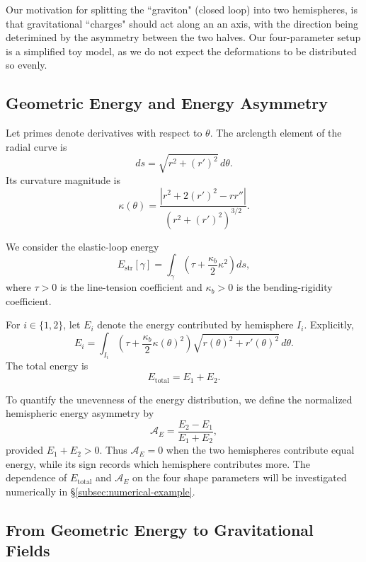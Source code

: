 \documentclass{article}
\numberwithin{tm}{section}
\numberwithin{dn}{section}
\numberwithin{as}{section}
\numberwithin{rk}{section}
\numberwithin{lem}{section}
\numberwithin{ax}{section}
\numberwithin{pp}{section}
\numberwithin{eg}{section}
\numberwithin{war}{section}
\numberwithin{equation}{section}
\numberwithin{prop}{section}
\numberwithin{nt}{section}
\numberwithin{rc}{section}
\begin{document}
Our motivation for splitting the ``graviton" (closed loop) into two hemispheres, is that gravitational ``charges" should act along an an axis, with the direction being deterimined by the asymmetry between the two halves. Our four-parameter setup is a simplified toy model, as we do not expect the deformations to be distributed so evenly.


\subsection{Geometric Energy and Energy Asymmetry}
\label{subsec:energy-asymmetry}

Let primes denote derivatives with respect to $\theta$.
The arclength element of the radial curve is
\[
ds=\sqrt{r^2+(r')^2}\,d\theta.
\]
Its curvature magnitude is
\[
\kappa(\theta)=
\frac{\left|r^2+2(r')^2-rr''\right|}
{\left(r^2+(r')^2\right)^{3/2}}.
\]

We consider the elastic-loop energy
\begin{equation}
	\label{eq:string-energy}
	E_{\mathrm{str}}[\gamma]
	=
	\int_\gamma
	\left(\tau+\frac{\kappa_b}{2}\kappa^2\right)ds,
\end{equation}
where $\tau>0$ is the line-tension coefficient and
$\kappa_b>0$ is the bending-rigidity coefficient.

For $i\in\{1,2\}$, let $E_i$ denote the energy contributed
by hemisphere $I_i$. Explicitly,
\begin{equation}
	\label{eq:hemisphere-energy}
	E_i
	=
	\int_{I_i}
	\left(\tau+\frac{\kappa_b}{2}\kappa(\theta)^2\right)
	\sqrt{r(\theta)^2+r'(\theta)^2}\,d\theta.
\end{equation}
The total energy is
\begin{equation}
	\label{eq:total-energy}
	E_{\mathrm{total}}=E_1+E_2.
\end{equation}

To quantify the unevenness of the energy distribution, we
define the normalized hemispheric energy asymmetry by
\begin{equation}
	\label{eq:energy-asymmetry}
	\mathcal{A}_E
	=
	\frac{E_2-E_1}{E_1+E_2},
\end{equation}
provided $E_1+E_2>0$. Thus $\mathcal{A}_E=0$ when the two
hemispheres contribute equal energy, while its sign records
which hemisphere contributes more. The dependence of
$E_{\mathrm{total}}$ and $\mathcal{A}_E$ on the four shape
parameters will be investigated numerically in \S\ref{subsec:numerical-example}.


\subsection{From Geometric Energy to Gravitational Fields}
\label{subsec:gravity-preview}
\end{document}

